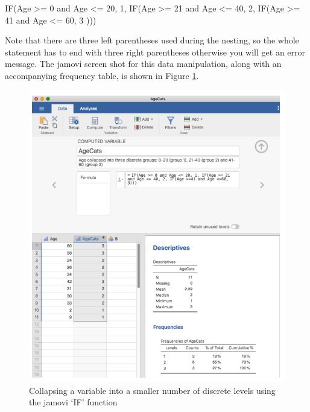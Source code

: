 \documentclass[
]{book}
\begin{document}
IF(Age \textgreater= 0 and Age \textless= 20, 1, IF(Age \textgreater= 21 and Age \textless= 40, 2, IF(Age \textgreater= 41 and Age \textless= 60, 3 )))

Note that there are three left parentheses used during the nesting, so the whole statement has to end with three right parentheses otherwise you will get an error message. The jamovi screen shot for this data manipulation, along with an accompanying frequency table, is shown in Figure \ref{fig:fig6-6}.

\begin{figure}
\includegraphics[width=0.9\linewidth]{images/Figure40} \caption{Collapsing a variable into a smaller number of discrete levels using the jamovi ‘IF’ function}\label{fig:fig6-6}
\end{figure}
\end{document}
